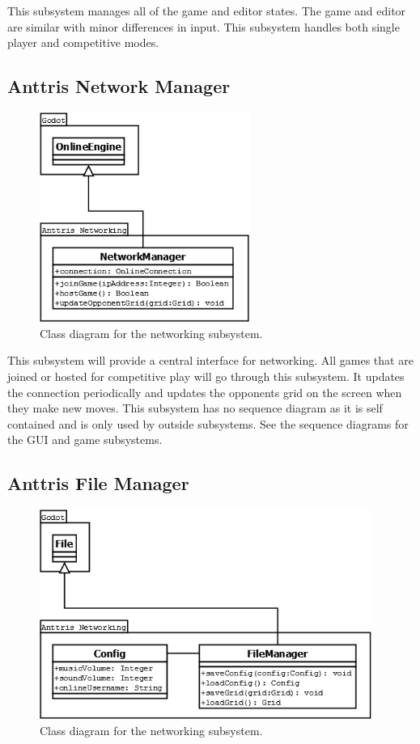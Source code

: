 \documentclass[12pt]{article}
\begin{document}
This subsystem manages all of the game and editor states. The game and editor are similar with minor differences in input. This subsystem handles both single player and competitive modes.

\subsection{Anttris Network Manager} %
    \begin{figure}[H]
        \centering
        \includegraphics[width=2.7in]{Anttris_NetworkingClass.png}
        \caption{Class diagram for the networking subsystem.}
    \end{figure}

This subsystem will provide a central interface for networking. All games that are joined or hosted for competitive play will go through this subsystem. It updates the connection periodically and updates the opponents grid on the screen when they make new moves. This subsystem has no sequence diagram as it is self contained and is only used by outside subsystems. See the sequence diagrams for the GUI and game subsystems.

\subsection{Anttris File Manager} %
    \begin{figure}[H]
        \centering
        \includegraphics[width=4.27in]{Anttris_FileClass.png}
        \caption{Class diagram for the networking subsystem.}
    \end{figure}
\end{document}

